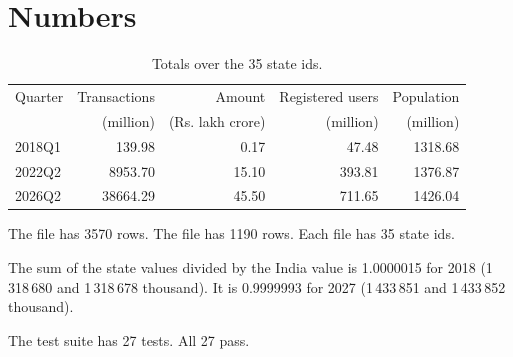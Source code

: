 \documentclass[11pt,a4paper]{article}
\begin{document}
\section{Numbers}
\begin{table}[h]
\centering
\caption{Totals over the 35 state ids.}
\begin{tabular}{lrrrr}
\toprule
Quarter & Transactions & Amount & Registered users & Population \\
 & (million) & (Rs. lakh crore) & (million) & (million) \\
\midrule
2018Q1 & 139.98 & 0.17 & 47.48 & 1318.68 \\
2022Q2 & 8953.70 & 15.10 & 393.81 & 1376.87 \\
2026Q2 & 38664.29 & 45.50 & 711.65 & 1426.04 \\
\bottomrule
\end{tabular}
\end{table}

The file  has 3570 rows. The file  has 1190 rows. Each file has 35 state ids.

The sum of the state values divided by the India value is 1.0000015 for 2018 (1\,318\,680 and 1\,318\,678 thousand). It is 0.9999993 for 2027 (1\,433\,851 and 1\,433\,852 thousand).

The test suite has 27 tests. All 27 pass.
\end{document}
